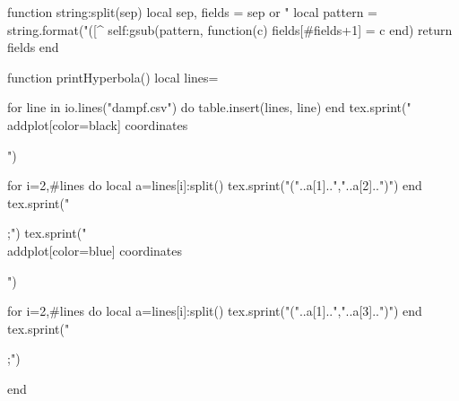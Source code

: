 \begin{luacode*}
function string:split(sep)
        local sep, fields = sep or "%
        local pattern = string.format("([^%
        self:gsub(pattern, function(c) fields[#fields+1] = c end)
        return fields
end

function printHyperbola()
    local lines={}

    for line in io.lines("dampf.csv") do
            table.insert(lines, line)
    end
    tex.sprint("\\addplot[color=black] coordinates{")

    for i=2,#lines do
        local a=lines[i]:split()
        tex.sprint("("..a[1]..","..a[2]..")")
    end
     tex.sprint("};")
    tex.sprint("\\addplot[color=blue] coordinates{")

    for i=2,#lines do
        local a=lines[i]:split()
        tex.sprint("("..a[1]..","..a[3]..")")
    end
     tex.sprint("};")

end
\end{luacode*}